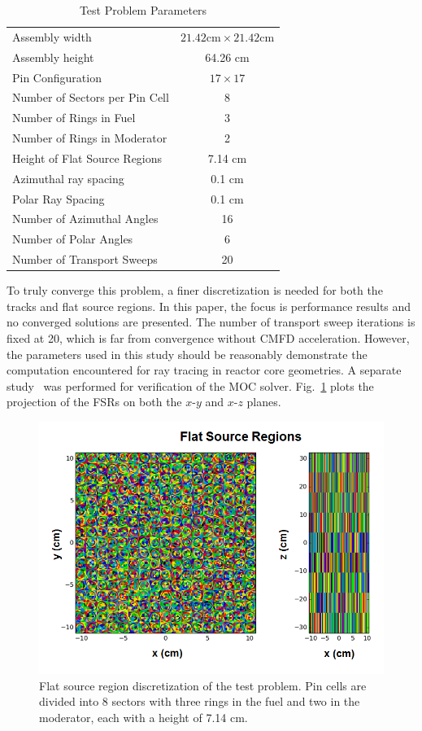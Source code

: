 \begin{table}[ht]
	\centering
	\caption{Test Problem Parameters}
	\medskip
	\begin{tabular}{|l|c|}
		\hline
		Assembly width &  $21.42 \text{cm} \times 21.42 \text{cm}$\\
		Assembly height & 64.26 cm\\
		Pin Configuration &  $17\times 17$\\
		Number of Sectors per Pin Cell & 8 \\
		Number of Rings in Fuel &  3 \\
		Number of Rings in Moderator & 2 \\
		Height of Flat Source Regions & 7.14 cm \\
		Azimuthal ray spacing & 0.1 cm \\
		Polar Ray Spacing & 0.1 cm \\
		Number of Azimuthal Angles & 16 \\
		Number of Polar Angles & 6 \\
		Number of Transport Sweeps & 20 \\
		\hline
	\end{tabular}
	\label{tab::problem}
\end{table}

To truly converge this problem, a finer discretization is needed for both the tracks and flat source regions. In this paper, the focus is performance results and no converged solutions are presented. The number of transport sweep iterations is fixed at 20, which is far from convergence without CMFD acceleration. However, the parameters used in this study should be reasonably demonstrate the computation encountered for ray tracing in reactor core geometries. A separate study~\cite{sam_new} was performed for verification of the MOC solver. Fig.~\ref{fig::FSRs} plots the projection of the FSRs on both the $x$-$y$ and $x$-$z$ planes.


\begin{figure}[ht!]
	\centering
	\includegraphics[width=0.75\linewidth]{figures/ph2016/fsrs.png}
	\caption{Flat source region discretization of the test problem. Pin cells are divided into 8 sectors with three rings in the fuel and two in the moderator, each with a height of 7.14 cm.}
	\label{fig::FSRs}
\end{figure}


